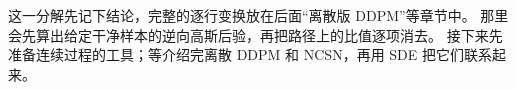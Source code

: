 这一分解先记下结论，完整的逐行变换放在后面“离散版 DDPM”等章节中。
那里会先算出给定干净样本的逆向高斯后验，再把路径上的比值逐项消去。
接下来先准备连续过程的工具；等介绍完离散 DDPM 和 NCSN，再用 SDE 把它们联系起来。
